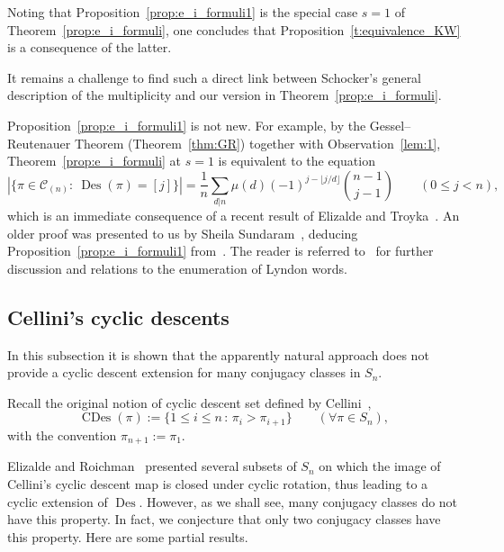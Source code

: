 \documentclass[ALCO,published]{cedram}
\newcommand{\C}{\mathcal C}
\DeclareMathOperator\Des{Des}
\DeclareMathOperator\CDes{CDes}
\begin{document}
\begin{remark}
    Noting that Proposition~\ref{prop:e_i_formuli1} is the special case $s=1$ of Theorem~\ref{prop:e_i_formuli}, one concludes that Proposition~\ref{t:equivalence_KW} is a consequence of the latter.
\end{remark}

It remains a challenge to find such a direct link between Schocker's general description of the multiplicity and our version in Theorem~\ref{prop:e_i_formuli}.

\begin{remark}\label{rem:ET}
    Proposition~\ref{prop:e_i_formuli1} 
    is not new.
    For example, by the Gessel--Reutenauer Theorem (Theorem~\ref{thm:GR}) together with Observation~\ref{lem:1}, 
    Theorem~\ref{prop:e_i_formuli} at $s=1$ is equivalent to the equation
    \[
        |\{\pi\in \C_{(n)}: \ \Des(\pi)=[j]\}|
        = \frac{1}{n} \sum_{d|n} \mu(d) (-1)^{j - \lfloor j/d \rfloor} \binom{n-1}{j-1}
        \qquad (0 \le j <n),        
    \]
    which is an immediate consequence of a recent result of Elizalde and Troyka~\cite[ Theorem 3.1]{ET}.  
    An older proof was presented to us by Sheila Sundaram~\cite{Sundaram_personal}, deducing 
    Proposition~\ref{prop:e_i_formuli1} 
    from~\cite[Lemma 2.7]{Sundaram_Adv}. 
    The reader is referred to~\cite{ET} for further discussion and relations to the enumeration of Lyndon words.  
\end{remark}


\subsection{Cellini's cyclic descents}\label{sec:Cellini}
	
In this subsection it is shown that the apparently natural approach does not provide a cyclic descent extension for many conjugacy classes in $S_n$.
	
Recall the original notion of cyclic descent set defined by Cellini~\cite{Cellini},
\[
	\CDes(\pi) 
	:= \{1 \leq i \leq n \,:\, \pi_i > \pi_{i+1} \}
    \qquad (\forall \pi \in S_n),
\]
with the convention $\pi_{n+1}:=\pi_1$.
	
Elizalde and Roichman~\cite{ER19} presented several subsets of $S_n$ on which the image of Cellini's cyclic descent map is closed under cyclic rotation, thus leading to a cyclic extension of $\Des$.
However, as we shall see, many conjugacy classes do not have this property. In fact, we conjecture that only two conjugacy classes have this property.
Here are some partial results.
	
\end{document}
